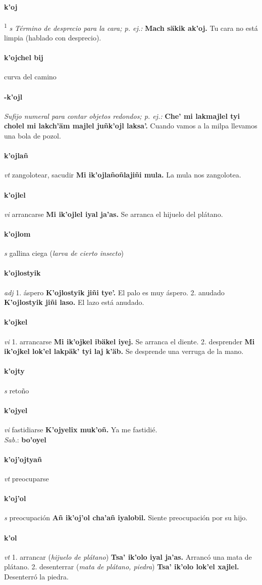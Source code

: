 \documentclass{scrbook}
\newcommand{\entry}[1]{\paragraph{#1}}
\newcommand{\onedefinition}[1]{#1.}
\newcommand{\defsuperscript}[1]{\textsuperscript{1}}
\newcommand{\nontranslationdef}[1]{\textit{#1}}
\newcommand{\partofspeech}[1]{\textit{#1}}
\newcommand{\spanishtranslation}[1]{#1}
\newcommand{\clarification}[1]{(\textit{#1})}
\newcommand{\cholexample}[1]{\textbf{#1}}
\newcommand{\exampletranslation}[1]{#1}
\newcommand{\dialectvariant}[1]{\\\textit{#1}:}
\newcommand{\dialectword}[1]{\textbf{#1}}
\begin{document}
\begin{multicols}{2}
\entry{k'oj}
\defsuperscript{2}
\partofspeech{s}
\nontranslationdef{Término de desprecio para la cara; p. ej.:}
\cholexample{Mach säkik ak'oj.}
\exampletranslation{Tu cara no está limpia (hablado con desprecio).}

\entry{k'ojchel bij}
\spanishtranslation{curva del camino}

\entry{-k'ojl}
\nontranslationdef{Sufijo numeral para contar objetos redondos; p. ej.:}
\cholexample{Che' mi lakmajlel tyi cholel mi lakch'äm majlel juñk'ojl laksa'.}
\exampletranslation{Cuando vamos a la milpa llevamos una bola de pozol.}

\entry{k'ojlañ}
\partofspeech{vt}
\spanishtranslation{zangolotear, sacudir}
\cholexample{Mi ik'ojlañoñlajiñi mula.}
\exampletranslation{La mula nos zangolotea.}

\entry{k'ojlel}
\partofspeech{vi}
\spanishtranslation{arrancarse}
\cholexample{Mi ik'ojlel iyal ja'as.}
\exampletranslation{Se arranca el hijuelo del plátano.}

\entry{k'ojlom}
\partofspeech{s}
\spanishtranslation{gallina ciega}
\clarification{larva de cierto insecto}

\entry{k'ojlostyik}
\partofspeech{adj}
\onedefinition{1}
\spanishtranslation{áspero}
\cholexample{K'ojlostyik jiñi tye'.}
\exampletranslation{El palo es muy áspero.}
\onedefinition{2}
\spanishtranslation{anudado}
\cholexample{K'ojlostyik jiñi laso.}
\exampletranslation{El lazo está anudado.}

\entry{k'ojkel}
\partofspeech{vi}
\onedefinition{1}
\spanishtranslation{arrancarse}
\cholexample{Mi ik'ojkel ibäkel iyej.}
\exampletranslation{Se arranca el diente.}
\onedefinition{2}
\spanishtranslation{desprender}
\cholexample{Mi ik'ojkel lok'el lakpäk' tyi laj k'äb.}
\exampletranslation{Se desprende una verruga de la mano.}

\entry{k'ojty}
\partofspeech{s}
\spanishtranslation{retoño}

\entry{k'ojyel}
\partofspeech{vi}
\spanishtranslation{fastidiarse}
\cholexample{K'ojyelix muk'oñ.}
\exampletranslation{Ya me fastidié.}
\dialectvariant{Sab.}
\dialectword{bo'oyel}

\entry{k'oj'ojtyañ}
\partofspeech{vt}
\spanishtranslation{preocuparse}

\entry{k'oj'ol}
\partofspeech{s}
\spanishtranslation{preocupación}
\cholexample{Añ ik'oj'ol cha'añ iyalobil.}
\exampletranslation{Siente preocupación por su hijo.}

\entry{k'ol}
\partofspeech{vt}
\onedefinition{1}
\spanishtranslation{arrancar}
\clarification{hijuelo de plátano}
\cholexample{Tsa' ik'olo iyal ja'as.}
\exampletranslation{Arrancó una mata de plátano.}
\onedefinition{2}
\spanishtranslation{desenterrar}
\clarification{mata de plátano, piedra}
\cholexample{Tsa' ik'olo lok'el xajlel.}
\exampletranslation{Desenterró la piedra.}


\end{multicols}
\end{document}
